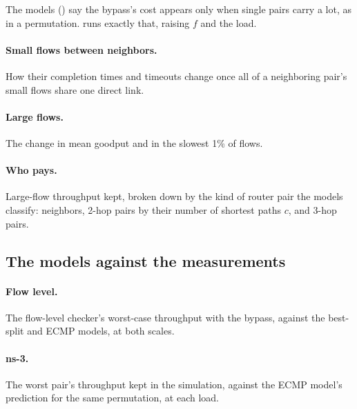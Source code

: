 The models () say the bypass's cost appears only when single pairs carry a lot, as in a permutation.  runs exactly that, raising $f$ and the load.

\paragraph{Small flows between neighbors.} How their completion times and timeouts change once all of a neighboring pair's small flows share one direct link.

\paragraph{Large flows.} The change in mean goodput and in the slowest 1\% of flows.

\paragraph{Who pays.} Large-flow throughput kept, broken down by the kind of router pair the models classify: neighbors, 2-hop pairs by their number of shortest paths $c$, and 3-hop pairs.

\subsection{The models against the measurements}
\label{sec:models-vs-sim}

\paragraph{Flow level.} The flow-level checker's worst-case throughput with the bypass, against the best-split and ECMP models, at both scales.

\paragraph{ns-3.} The worst pair's throughput kept in the simulation, against the ECMP model's prediction for the same permutation, at each load.
